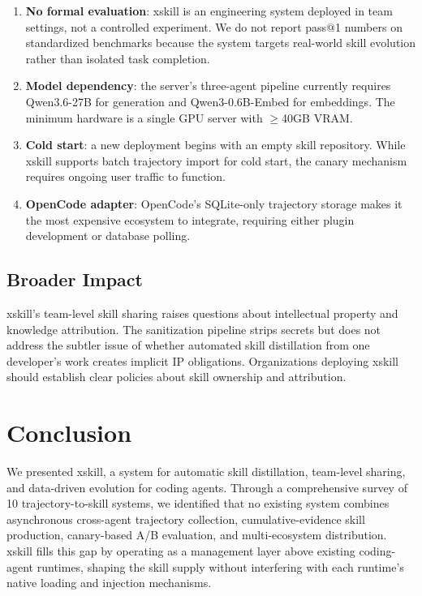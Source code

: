 \documentclass[11pt]{article}
\begin{document}
\begin{enumerate}
    \item \textbf{No formal evaluation}: xskill is an engineering system deployed in team settings, not a controlled experiment. We do not report pass@1 numbers on standardized benchmarks because the system targets real-world skill evolution rather than isolated task completion.
    \item \textbf{Model dependency}: the server's three-agent pipeline currently requires Qwen3.6-27B for generation and Qwen3-0.6B-Embed for embeddings. The minimum hardware is a single GPU server with $\geq$40GB VRAM.
    \item \textbf{Cold start}: a new deployment begins with an empty skill repository. While xskill supports batch trajectory import for cold start, the canary mechanism requires ongoing user traffic to function.
    \item \textbf{OpenCode adapter}: OpenCode's SQLite-only trajectory storage makes it the most expensive ecosystem to integrate, requiring either plugin development or database polling.
\end{enumerate}

\subsection{Broader Impact}

xskill's team-level skill sharing raises questions about intellectual property and knowledge attribution. The sanitization pipeline strips secrets but does not address the subtler issue of whether automated skill distillation from one developer's work creates implicit IP obligations. Organizations deploying xskill should establish clear policies about skill ownership and attribution.

\section{Conclusion}
\label{sec:conclusion}

We presented xskill, a system for automatic skill distillation, team-level sharing, and data-driven evolution for coding agents. Through a comprehensive survey of 10 trajectory-to-skill systems, we identified that no existing system combines asynchronous cross-agent trajectory collection, cumulative-evidence skill production, canary-based A/B evaluation, and multi-ecosystem distribution. xskill fills this gap by operating as a management layer above existing coding-agent runtimes, shaping the skill supply without interfering with each runtime's native loading and injection mechanisms.
\end{document}
